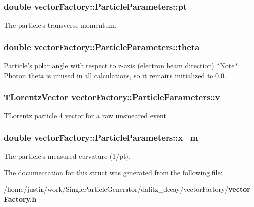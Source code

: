 \subsubsection{\setlength{\rightskip}{0pt plus 5cm}double \bf{vector\-Factory::Particle\-Parameters::pt}}\label{structvectorFactory_1_1ParticleParameters_f7fd158513cf6690d9d6672a4af60022}


The particle's transverse momentum. 
\subsubsection{\setlength{\rightskip}{0pt plus 5cm}double \bf{vector\-Factory::Particle\-Parameters::theta}}\label{structvectorFactory_1_1ParticleParameters_15a254897236c9cbbf07c1f468304104}


Particle's polar angle with respect to z-axis (electron beam direction) $\ast$Note$\ast$ Photon theta is unused in all calculations, so it remains initialized to 0.0. 
\subsubsection{\setlength{\rightskip}{0pt plus 5cm}TLorentz\-Vector \bf{vector\-Factory::Particle\-Parameters::v}}\label{structvectorFactory_1_1ParticleParameters_5fca86d6e11698757a26dc696ab15361}


TLorentz particle 4 vector for a raw unsmeared event 
\subsubsection{\setlength{\rightskip}{0pt plus 5cm}double \bf{vector\-Factory::Particle\-Parameters::x\_\-m}}\label{structvectorFactory_1_1ParticleParameters_fdac11560cb82caeb2e89b5758db3cee}


The particle's measured curvature (1/pt). 

The documentation for this struct was generated from the following file:\begin{CompactItemize}
\item 
/home/justin/work/Single\-Particle\-Generator/dalitz\_\-decay/vector\-Factory/\bf{vector\-Factory.h}\end{CompactItemize}
